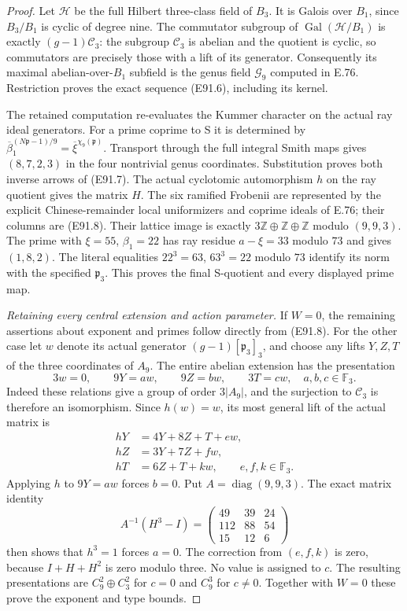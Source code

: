 \begin{proof}
Let $\mathcal H$ be the full Hilbert three-class field of $B_3$.
It is Galois over $B_1$, since $B_3/B_1$ is cyclic of degree
nine. The commutator subgroup of
$\operatorname{Gal}(\mathcal H/B_1)$ is exactly $(g-1)\mathcal C_3$:
the subgroup $\mathcal C_3$ is abelian and the quotient is cyclic, so
commutators are precisely those with a lift of its generator.
Consequently its maximal abelian-over-$B_1$ subfield is the
genus field $\mathcal G_9$ computed in E.76. Restriction proves
the exact sequence (E91.6), including its kernel.

The retained computation re-evaluates the Kummer character on
the actual ray ideal generators. For a prime coprime to S it
is determined by
$\overline\beta_1^{(N\mathfrak p-1)/9}
 =\overline\xi^{\chi_9(\mathfrak p)}$.
Transport through the full integral Smith maps gives
$(8,7,2,3)$ in the four nontrivial genus coordinates. Substitution
proves both inverse arrows of (E91.7). The actual cyclotomic
automorphism $h$ on the ray quotient gives the matrix $H$.
The six ramified Frobenii are represented by the explicit
Chinese-remainder local uniformizers and coprime ideals of
E.76; their columns are (E91.8). Their lattice image is exactly
$3\mathbb Z\oplus\mathbb Z\oplus\mathbb Z$ modulo
$(9,9,3)$. The prime with $\xi=55$, $\beta_1=22$ has ray
residue $a-\xi=33$ modulo $73$ and gives $(1,8,2)$.
The literal equalities $22^3=63$, $63^3=22$ modulo $73$
identify its norm with the specified $\mathfrak p_3$.
This proves the final S-quotient and every displayed prime map.

\emph{Retaining every central extension and action parameter.}
If $W=0$, the remaining assertions about exponent and primes
follow directly from (E91.8). For the other case let $w$ denote
its actual generator $(g-1)[\mathfrak p_3]_3$, and choose any
lifts $Y,Z,T$ of the three coordinates of $A_9$. The entire
abelian extension has the presentation
\[
 3w=0,\qquad 9Y=a w,\qquad 9Z=b w,\qquad 3T=c w,
             \quad a,b,c\in\mathbb F_3.
 \tag{E91.16}
\]
Indeed these relations give a group of order $3|A_9|$, and
the surjection to $\mathcal C_3$ is therefore an isomorphism. Since
$h(w)=w$, its most general lift of the actual matrix is
\[
 \begin{aligned}
 hY&=4Y+8Z+T+e w,\\
 hZ&=3Y+7Z+f w,\\
 hT&=6Z+T+k w,\qquad e,f,k\in\mathbb F_3.
 \end{aligned}
 \tag{E91.17}
\]
Applying $h$ to $9Y=a w$ forces $b=0$. Put
$A=\operatorname{diag}(9,9,3)$. The exact matrix identity
\[
 A^{-1}(H^3-I)=
 \begin{pmatrix}49&39&24\\112&88&54\\15&12&6\end{pmatrix}
 \tag{E91.18}
\]
then shows that $h^3=1$ forces $a=0$. The correction from
$(e,f,k)$ is zero, because $I+H+H^2$ is zero modulo three.
No value is assigned to $c$. The resulting presentations are
$C_9^2\oplus C_3^2$ for $c=0$ and $C_9^3$ for $c\ne0$.
Together with $W=0$ these prove the exponent and type bounds.


\end{proof}
